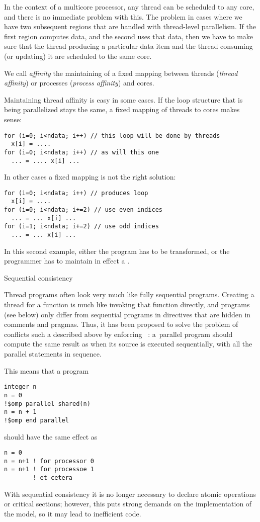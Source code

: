 In the context of a multicore processor, any thread can be scheduled
to any core, and there is no immediate problem with this. The problem
in cases where we have two subsequent regions that are handled with
thread-level parallelism. If the first region computes data, and the
second uses that data, then we have to make sure that the thread
producing a particular data item and the thread consuming (or
updating) it are scheduled to the same core.

We call \emph{affinity} the maintaining of a fixed mapping between
threads (\emph{thread affinity})
or processes (\emph{process
  affinity}) and cores.

Maintaining thread affinity is easy in some cases. If the loop
structure that is being parallelized stays the same, a fixed mapping
of threads to cores makes sense:
\begin{verbatim}
for (i=0; i<ndata; i++) // this loop will be done by threads
  x[i] = ....
for (i=0; i<ndata; i++) // as will this one
  ... = .... x[i] ...
\end{verbatim}
In other cases a fixed mapping is not the right solution:
\begin{verbatim}
for (i=0; i<ndata; i++) // produces loop
  x[i] = ....
for (i=0; i<ndata; i+=2) // use even indices
  ... = ... x[i] ...
for (i=1; i<ndata; i+=2) // use odd indices
  ... = ... x[i] ...
\end{verbatim}
In this second example, either the program has to be transformed, or
the programmer has to maintain in effect a .


 {Sequential consistency}
\label{sec:seq-consist}

Thread programs often look very much like fully sequential
programs. Creating a thread for a function is much like invoking that
function directly, and  programs (see below) only
differ from sequential programs in directives that are hidden in
comments and pragmas. Thus, it has been proposed to solve the problem
of conflicts such a described above by enforcing ~\cite{Lamport:sequential}: a~parallel program should
compute the same result as when its source is executed sequentially,
with all the parallel statements in sequence.

This means that a program
\begin{verbatim}
integer n
n = 0
!$omp parallel shared(n)
n = n + 1
!$omp end parallel
\end{verbatim}
should have the same effect as
\begin{verbatim}
n = 0
n = n+1 ! for processor 0
n = n+1 ! for processoe 1
        ! et cetera
\end{verbatim}
With sequential consistency it is no longer necessary to declare
atomic operations or critical sections; however, this puts strong
demands on the implementation of the model, so it may lead to
inefficient code.

